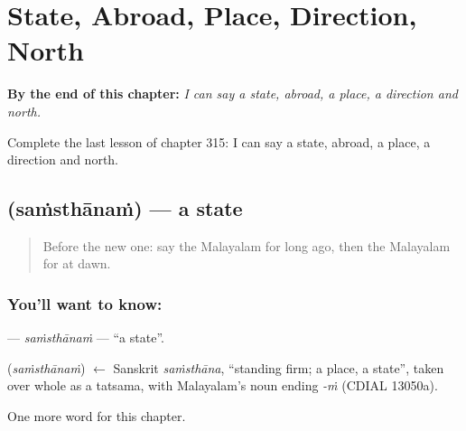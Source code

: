 
\chapter{State, Abroad, Place, Direction, North}
\label{ch:ml-state-abroad-place-direction-north}

\begin{chapteropening}
\textbf{By the end of this chapter:} \emph{I can say a state, abroad, a place, a direction and north.}

Complete the last lesson of chapter 315: I can say a state, abroad, a place, a direction and north.
\end{chapteropening}

\section[\texorpdfstring{\ml{സംസ്ഥാനം} (saṁsthānaṁ)}{സംസ്ഥാനം (saṁsthānaṁ)}]{ (saṁsthānaṁ) — a state}

\label{lesson:ML-C315-samsthanam}



\begin{quote}
Before the new one: say the Malayalam for long ago, then the Malayalam for at dawn.
\end{quote}

\subsection*{You'll want to know: }
\textbf{} — \emph{saṁsthānaṁ} — \textquotedblleft{}a state\textquotedblright{}.

\begin{cousinweb}
\textbf{} (\emph{saṁsthānaṁ}) $\leftarrow$ Sanskrit \emph{saṁsthāna}, \textquotedblleft{}standing firm; a place, a state\textquotedblright{}, taken over whole as a tatsama, with Malayalam's noun ending \emph{-ṁ} (CDIAL 13050a).
\end{cousinweb}

\begin{grammarlens}[title={What you've built}]
One more word for this chapter.
\end{grammarlens}

